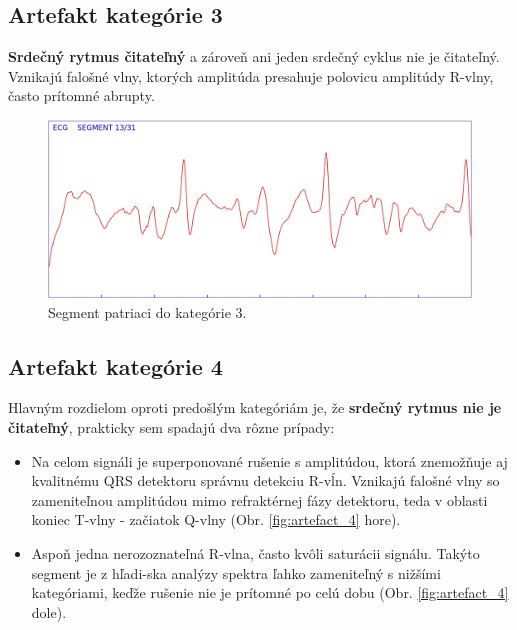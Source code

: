 \subsection{Artefakt kategórie 3}

\textbf{Srdečný rytmus čitateľný} a zároveň ani jeden srdečný cyklus nie je čitateľný. Vznikajú falošné vlny, ktorých amplitúda presahuje polovicu amplitúdy R-vlny, často prítomné abrupty.

\begin{figure}[H]
    \centering    
    \includegraphics[scale=0.25]{img/artefact_3.jpeg}
    \caption{Segment patriaci do kategórie 3.}
    \label{fig:artefact_3}
\end{figure}

\newpage

\subsection{Artefakt kategórie 4}

Hlavným rozdielom oproti predošlým kategóriám je, že \textbf{srdečný rytmus nie je čitateľný}, prakticky sem spadajú dva rôzne prípady:

\begin{itemize}
    \item Na celom signáli je superponované rušenie s amplitúdou, ktorá znemožňuje aj kvalitnému QRS detektoru správnu detekciu R-vĺn. Vznikajú falošné vlny so zameniteľnou amplitúdou mimo refraktérnej fázy detektoru, teda v oblasti koniec T-vlny - začiatok Q-vlny (Obr. \ref{fig:artefact_4} hore).
    \item Aspoň jedna nerozoznateľná R-vlna, často kvôli saturácii signálu. Takýto segment je z hľadi-ska analýzy spektra ľahko zameniteľný s nižšími kategóriami, keďže rušenie nie je prítomné po celú dobu (Obr. \ref{fig:artefact_4} dole). 
\end{itemize}


